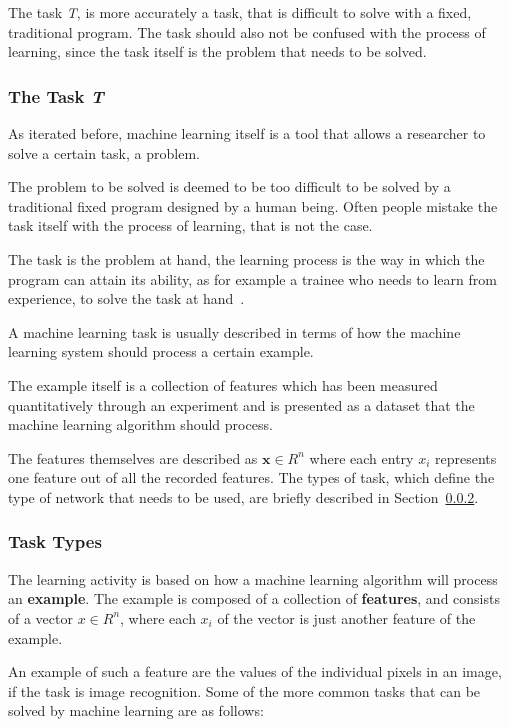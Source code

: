 \documentclass[12pt]{article}
\begin{document}
The task \textit{T}, is more accurately a task, that is difficult to solve with a fixed, traditional program. The task should also not be confused with the process of learning, since the task itself is the problem that needs to be solved.

\subsubsection{The Task \textit{T}}
\label{subsub:task}

As iterated before, machine learning itself is a tool that allows a researcher to solve a certain task, a problem. 

The problem to be solved is deemed to be too difficult to be solved by a traditional fixed program designed by a human being. Often people mistake the task itself with the process of learning, that is not the case. 

The task is the problem at hand, the learning process is the way in which the program can attain its ability, as for example a trainee who needs to learn from experience, to solve the task at hand~\citep{deeplearningbook}.

A machine learning task is usually described in terms of how the machine learning system should process a certain example. 

The example itself is a collection of features which has been measured quantitatively through an experiment and is presented as a dataset that the machine learning algorithm should process. 

The features themselves are described as $\textbf{x} \in R^n$ where each entry $x_i$ represents one feature out of all the recorded features. The types of task, which define the type of network that needs to be used, are briefly described in Section~\ref{subsub:task_types}. 

\subsubsection{Task Types}
\label{subsub:task_types}

The learning activity is based on how a machine learning algorithm will process an \textbf{example}. The example is composed of a collection of \textbf{features}, and consists of a vector $x \in R^n$, where each $x_i$ of the vector is just another feature of the example. 

An example of such a feature are the values of the individual pixels in an image, if the task is image recognition. Some of the more common tasks that can be solved by machine learning are as follows:
\end{document}
